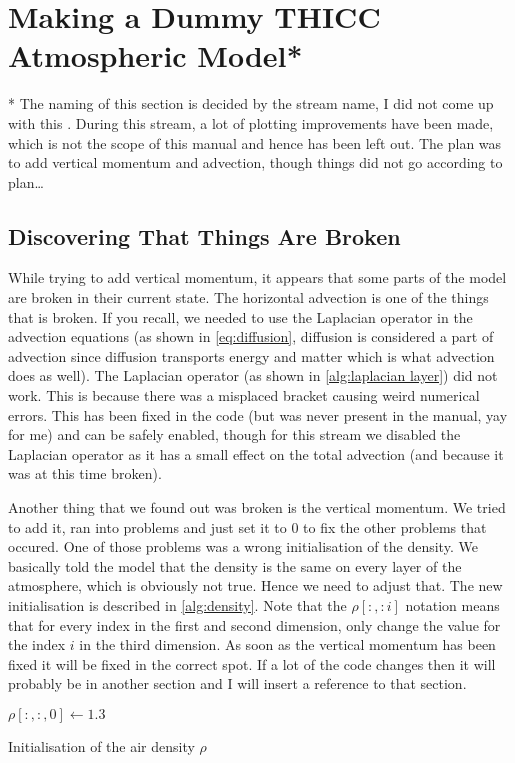 \section{Making a Dummy THICC Atmospheric Model*}
* The naming of this section is decided by the stream name, I did not come up with this \cite{twitch}. During this stream, a lot of plotting improvements have been made, which is not the scope of
this manual and hence has been left out. The plan was to add vertical momentum and advection, though things did not go according to plan\dots

\subsection{Discovering That Things Are Broken}
While trying to add vertical momentum, it appears that some parts of the model are broken in their current state. The horizontal advection is one of the things that is broken. If you recall, 
we needed to use the Laplacian operator in the advection equations (as shown in \autoref{eq:diffusion}, diffusion is considered a part of advection since diffusion transports energy and matter
which is what advection does as well). The Laplacian operator (as shown in \autoref{alg:laplacian layer}) did not work. This is because there was a misplaced bracket causing weird numerical errors.
This has been fixed in the code (but was never present in the manual, yay for me) and can be safely enabled, though for this stream we disabled the Laplacian operator as it has a small effect on 
the total advection (and because it was at this time broken). %

Another thing that we found out was broken is the vertical momentum. We tried to add it, ran into problems and just set it to 0 to fix the other problems that occured. One of those problems was 
a wrong initialisation of the density. We basically told the model that the density is the same on every layer of the atmosphere, which is obviously not true. Hence we need to adjust that. The 
new initialisation is described in \autoref{alg:density}. Note that the $\rho[:,: i]$ notation means that for every index in the first and second dimension, only change the value for the index $i$
in the third dimension. As soon as the vertical momentum has been fixed it will be fixed in the correct spot. If a lot of the code changes then it will probably be in another section and I will 
insert a reference to that section.

\begin{algorithm}
    $\rho[:, :, 0] \leftarrow 1.3$ \;
    \caption{Initialisation of the air density $\rho$}
    \label{alg:density}
\end{algorithm}